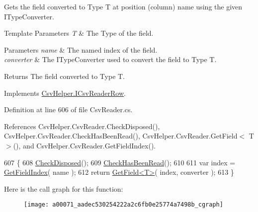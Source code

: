 Gets the field converted to Type T at position (column) name using the given I\-Type\-Converter. 


\begin{DoxyTemplParams}{Template Parameters}
{\em T} & The Type of the field.\\
\hline
\end{DoxyTemplParams}

\begin{DoxyParams}{Parameters}
{\em name} & The named index of the field.\\
\hline
{\em converter} & The I\-Type\-Converter used to convert the field to Type T.\\
\hline
\end{DoxyParams}
\begin{DoxyReturn}{Returns}
The field converted to Type T.
\end{DoxyReturn}


Implements \hyperlink{a00109_a640689c76826aafd8c79ff71d4f0992d}{Csv\-Helper.\-I\-Csv\-Reader\-Row}.



Definition at line 606 of file Csv\-Reader.\-cs.



References Csv\-Helper.\-Csv\-Reader.\-Check\-Disposed(), Csv\-Helper.\-Csv\-Reader.\-Check\-Has\-Been\-Read(), Csv\-Helper.\-Csv\-Reader.\-Get\-Field$<$ T $>$(), and Csv\-Helper.\-Csv\-Reader.\-Get\-Field\-Index().


\begin{DoxyCode}
607         \{
608             \hyperlink{a00071_a6fa45a46ed1322dc1872ca2321b5edbc}{CheckDisposed}();
609             \hyperlink{a00071_a2d9249171ed1568e45d152766d364c31}{CheckHasBeenRead}();
610 
611             var index = \hyperlink{a00071_a7e507d40e35fde7bf23e208be7be0884}{GetFieldIndex}( name );
612             \textcolor{keywordflow}{return} \hyperlink{a00071_a6a43cfaf39caea93ecd87e506be7b404}{GetField<T>}( index, converter );
613         \}
\end{DoxyCode}


Here is the call graph for this function\-:
\nopagebreak
\begin{figure}[H]
\begin{center}
\leavevmode
\texttt{[image: a00071\_aadec530254222a2c6fb0e25774a7498b\_cgraph]}
\end{center}
\end{figure}


